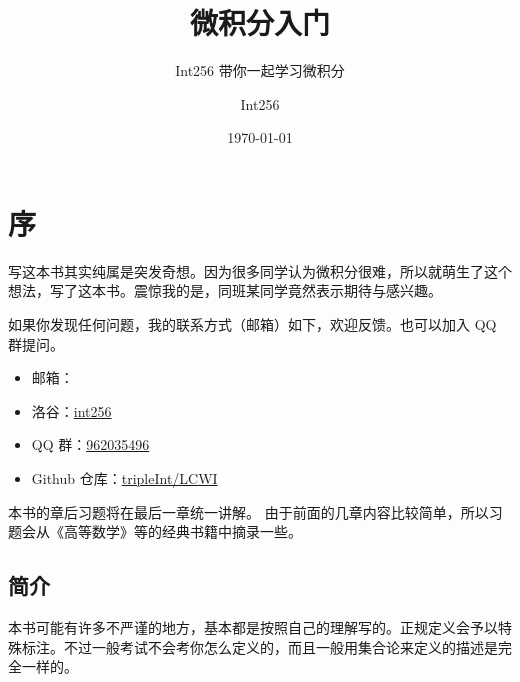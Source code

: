 \documentclass[lang=cn,10pt]{elegantbook}
\title{微积分入门}
\subtitle{Int256 带你一起学习微积分}
\author{Int256}
\date{\today}
\begin{document}
\maketitle
\frontmatter

\tableofcontents

\mainmatter

\chapter{序}

写这本书其实纯属是突发奇想。因为很多同学认为微积分很难，所以就萌生了这个想法，写了这本书。震惊我的是，同班某同学竟然表示期待与感兴趣。

如果你发现任何问题，我的联系方式（邮箱）如下，欢迎反馈。也可以加入 QQ 群提问。

\begin{itemize}
  \item 邮箱：
  \item 洛谷：\href{https://www.luogu.com.cn/user/344700}{int256}
  \item QQ 群：\href{https://jq.qq.com/?_wv=1027&k=lpfM484S}{962035496}
  \item Github 仓库：\href{https://github.com/tripleInt/LCWI}{tripleInt/LCWI}
\end{itemize}

本书的章后习题将在最后一章统一讲解。
由于前面的几章内容比较简单，所以习题会从《高等数学》等的经典书籍中摘录一些。

\section{简介}

本书可能有许多不严谨的地方，基本都是按照自己的理解写的。正规定义会予以特殊标注。不过一般考试不会考你怎么定义的，而且一般用集合论来定义的描述是完全一样的。
\end{document}
